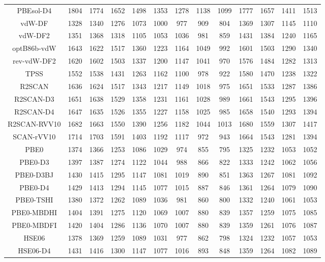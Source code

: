 \begin{table}[ht]
\begin{tabular}{ccccccccccccc}
PBEsol-D4 & 1804 & 1774 & 1652 & 1498 & 1353 & 1278 & 1138 & 1099 & 1777 & 1657 & 1411 & 1513 \\ 
vdW-DF & 1328 & 1340 & 1276 & 1073 & 1000 & 977 & 909 & 804 & 1369 & 1307 & 1145 & 1110 \\ 
vdW-DF2 & 1351 & 1368 & 1318 & 1105 & 1053 & 1036 & 981 & 859 & 1431 & 1384 & 1240 & 1165 \\ 
optB86b-vdW & 1643 & 1622 & 1517 & 1360 & 1223 & 1164 & 1049 & 992 & 1601 & 1503 & 1290 & 1340 \\ 
rev-vdW-DF2 & 1620 & 1602 & 1503 & 1337 & 1200 & 1147 & 1041 & 970 & 1576 & 1484 & 1282 & 1313 \\ 
TPSS & 1552 & 1538 & 1431 & 1263 & 1162 & 1100 & 978 & 922 & 1580 & 1470 & 1238 & 1322 \\ 
R2SCAN & 1636 & 1624 & 1517 & 1343 & 1217 & 1149 & 1018 & 975 & 1651 & 1533 & 1287 & 1386 \\ 
R2SCAN-D3 & 1651 & 1638 & 1529 & 1358 & 1231 & 1161 & 1028 & 989 & 1661 & 1543 & 1295 & 1396 \\ 
R2SCAN-D4 & 1647 & 1635 & 1526 & 1355 & 1227 & 1158 & 1025 & 985 & 1658 & 1540 & 1293 & 1394 \\ 
R2SCAN-RVV10 & 1682 & 1663 & 1550 & 1390 & 1256 & 1182 & 1044 & 1013 & 1680 & 1559 & 1307 & 1417 \\ 
SCAN-rVV10 & 1714 & 1703 & 1591 & 1403 & 1192 & 1117 & 972 & 943 & 1664 & 1543 & 1281 & 1394 \\ 
PBE0 & 1374 & 1366 & 1253 & 1086 & 1029 & 974 & 855 & 795 & 1325 & 1232 & 1053 & 1052 \\ 
PBE0-D3 & 1397 & 1387 & 1274 & 1122 & 1044 & 988 & 866 & 822 & 1333 & 1242 & 1062 & 1056 \\ 
PBE0-D3BJ & 1430 & 1415 & 1295 & 1147 & 1081 & 1019 & 890 & 851 & 1363 & 1267 & 1081 & 1092 \\ 
PBE0-D4 & 1429 & 1413 & 1294 & 1145 & 1077 & 1015 & 887 & 846 & 1361 & 1264 & 1079 & 1090 \\ 
PBE0-TSHI & 1380 & 1372 & 1262 & 1089 & 1036 & 981 & 860 & 800 & 1332 & 1240 & 1061 & 1053 \\ 
PBE0-MBDHI & 1404 & 1391 & 1275 & 1120 & 1069 & 1007 & 880 & 839 & 1357 & 1259 & 1075 & 1085 \\ 
PBE0-MBDFI & 1420 & 1404 & 1286 & 1136 & 1070 & 1007 & 880 & 839 & 1359 & 1261 & 1076 & 1087 \\ 
HSE06 & 1378 & 1369 & 1259 & 1089 & 1031 & 977 & 862 & 798 & 1324 & 1232 & 1057 & 1053 \\ 
HSE06-D4 & 1431 & 1416 & 1300 & 1147 & 1077 & 1016 & 893 & 848 & 1359 & 1264 & 1082 & 1089 \\ 

\end{tabular}
\end{table}
